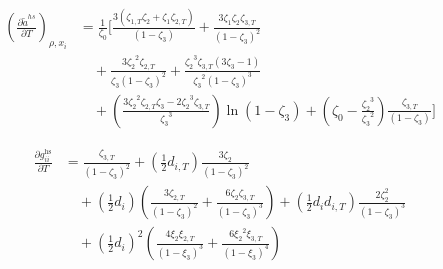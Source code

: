 \documentclass[12pt, letterpaper]{article}
\begin{document}
\begin{equation}
    \begin{aligned}
        \left(\frac{\partial\tilde{a}^{hs}}{\partial T}\right)_{\rho,x_{i}}
        &=\frac{1}{\zeta_{0}}\Bigg[
        \frac{3(\zeta_{1,T}\zeta_{2}+\zeta_{1}\zeta_{2,T})}{(1-\zeta_{3})}
        +\frac{3\zeta_{1}\zeta_{2}\zeta_{3,T}}{(1-\zeta_{3})^{2}}
        \\
        &\quad
        +\frac{3{\zeta_{2}}^{2}{\zeta_{2,T}}}{\zeta_{3}{(1-\zeta_{3})}^{2}}
        +\frac{{\zeta_{2}}^{3}{\zeta_{3,T}}(3{\zeta_{3}}-1)}{{\zeta_{3}}^{2}{(1-\zeta_{3})}^{3}}
        \\
        &\quad
        +\left(\frac{3{\zeta_{2}}^{2}{\zeta_{2,T}}{\zeta_{3}}-2{\zeta_{2}}^{3}{\zeta_{3,T}}}{{\zeta_{3}}^{3}}\right)\ln(1-{\zeta_{3}})
        +\left({\zeta_{0}}-\frac{{\zeta_{2}}^{3}}{{\zeta_{3}}^{2}}\right)\frac{\zeta_{3,T}}{(1-\zeta_{3})}
        \Bigg]
    \end{aligned}
    \label{eq:dares_hs_dT}
\end{equation}


\begin{equation}
    \begin{aligned}
        \frac{\partial g_{ii}^{\mathrm{hs}}}{\partial T}
        &=\frac{\zeta_{3,T}}{\left(1-\zeta_{3}\right)^{2}}
        +\left(\frac{1}{2}d_{i,T}\right)\frac{3\zeta_{2}}{\left(1-\zeta_{3}\right)^{2}}
        \\
        &\quad +\left(\frac{1}{2}d_{i}\right)\left(\frac{3\zeta_{2,T}}{\left(1-\zeta_{3}\right)^{2}}+\frac{6\zeta_{2}\zeta_{3,T}}{\left(1-\zeta_{3}\right)^{3}}\right)
        +\left(\frac{1}{2}d_{i}d_{i,T}\right)\frac{2\zeta_{2}^{2}}{\left(1-\zeta_{3}\right)^{3}}
        \\
        &\quad +\left(\frac{1}{2}d_{i}\right)^{2}\left(\frac{4\xi_{2}\xi_{2,T}}{\left(1-\xi_{3}\right)^{3}}+\frac{6\xi_{2}{}^{2}\xi_{3,T}}{\left(1-\xi_{3}\right)^{4}}\right)
    \end{aligned}
    \label{eq:dg_hs_dT}
\end{equation}

\end{document}
